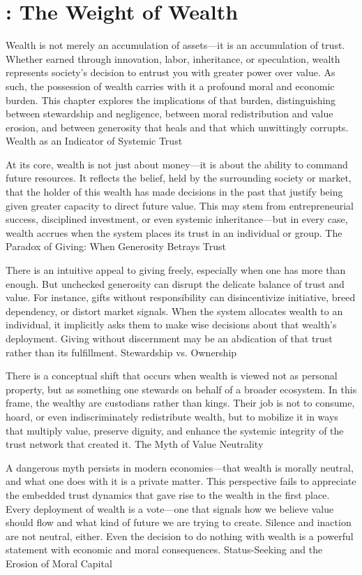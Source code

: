 \documentclass[11pt,oneside]{book}
\begin{document}
\chapter{: The Weight of Wealth}

Wealth is not merely an accumulation of assets—it is an accumulation of trust. Whether earned through innovation, labor, inheritance, or speculation, wealth represents society’s decision to entrust you with greater power over value. As such, the possession of wealth carries with it a profound moral and economic burden. This chapter explores the implications of that burden, distinguishing between stewardship and negligence, between moral redistribution and value erosion, and between generosity that heals and that which unwittingly corrupts.
Wealth as an Indicator of Systemic Trust

At its core, wealth is not just about money—it is about the ability to command future resources. It reflects the belief, held by the surrounding society or market, that the holder of this wealth has made decisions in the past that justify being given greater capacity to direct future value. This may stem from entrepreneurial success, disciplined investment, or even systemic inheritance—but in every case, wealth accrues when the system places its trust in an individual or group.
The Paradox of Giving: When Generosity Betrays Trust

There is an intuitive appeal to giving freely, especially when one has more than enough. But unchecked generosity can disrupt the delicate balance of trust and value. For instance, gifts without responsibility can disincentivize initiative, breed dependency, or distort market signals. When the system allocates wealth to an individual, it implicitly asks them to make wise decisions about that wealth’s deployment. Giving without discernment may be an abdication of that trust rather than its fulfillment.
Stewardship vs. Ownership

There is a conceptual shift that occurs when wealth is viewed not as personal property, but as something one stewards on behalf of a broader ecosystem. In this frame, the wealthy are custodians rather than kings. Their job is not to consume, hoard, or even indiscriminately redistribute wealth, but to mobilize it in ways that multiply value, preserve dignity, and enhance the systemic integrity of the trust network that created it.
The Myth of Value Neutrality

A dangerous myth persists in modern economies—that wealth is morally neutral, and what one does with it is a private matter. This perspective fails to appreciate the embedded trust dynamics that gave rise to the wealth in the first place. Every deployment of wealth is a vote—one that signals how we believe value should flow and what kind of future we are trying to create. Silence and inaction are not neutral, either. Even the decision to do nothing with wealth is a powerful statement with economic and moral consequences.
Status-Seeking and the Erosion of Moral Capital
\end{document}
